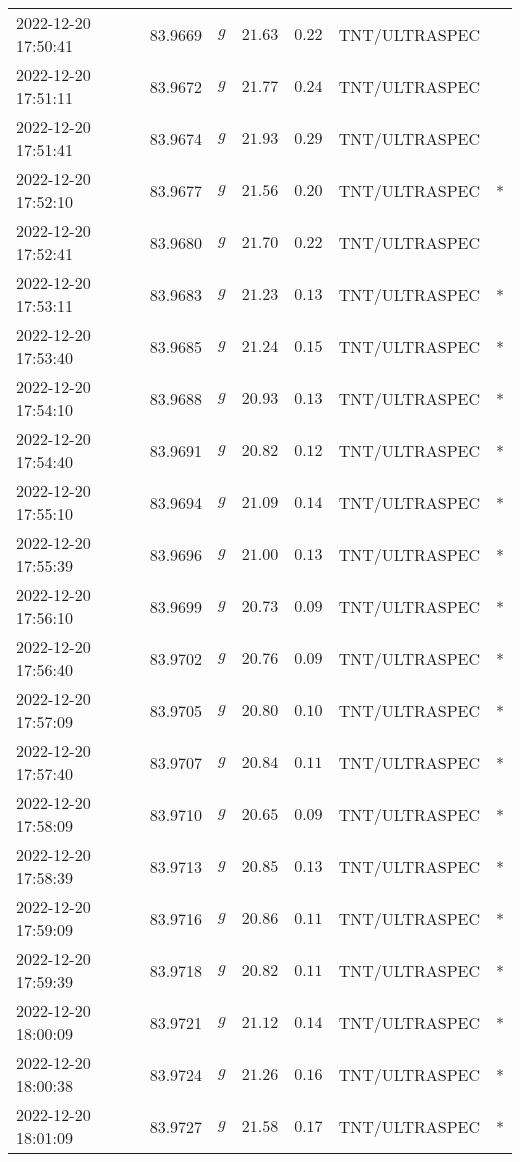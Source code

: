 \documentclass{nature_plusfigure}
\begin{document}
\begin{supplement}
\begin{center}
\begin{longtable}{lllllll}
2022-12-20 17:50:41 & 83.9669 & $g$ & $21.63$ & $0.22$ & TNT/ULTRASPEC &  \\ 
2022-12-20 17:51:11 & 83.9672 & $g$ & $21.77$ & $0.24$ & TNT/ULTRASPEC &  \\ 
2022-12-20 17:51:41 & 83.9674 & $g$ & $21.93$ & $0.29$ & TNT/ULTRASPEC &  \\ 
2022-12-20 17:52:10 & 83.9677 & $g$ & $21.56$ & $0.20$ & TNT/ULTRASPEC & * \\ 
2022-12-20 17:52:41 & 83.9680 & $g$ & $21.70$ & $0.22$ & TNT/ULTRASPEC &  \\ 
2022-12-20 17:53:11 & 83.9683 & $g$ & $21.23$ & $0.13$ & TNT/ULTRASPEC & * \\ 
2022-12-20 17:53:40 & 83.9685 & $g$ & $21.24$ & $0.15$ & TNT/ULTRASPEC & * \\ 
2022-12-20 17:54:10 & 83.9688 & $g$ & $20.93$ & $0.13$ & TNT/ULTRASPEC & * \\ 
2022-12-20 17:54:40 & 83.9691 & $g$ & $20.82$ & $0.12$ & TNT/ULTRASPEC & * \\ 
2022-12-20 17:55:10 & 83.9694 & $g$ & $21.09$ & $0.14$ & TNT/ULTRASPEC & * \\ 
2022-12-20 17:55:39 & 83.9696 & $g$ & $21.00$ & $0.13$ & TNT/ULTRASPEC & * \\ 
2022-12-20 17:56:10 & 83.9699 & $g$ & $20.73$ & $0.09$ & TNT/ULTRASPEC & * \\ 
2022-12-20 17:56:40 & 83.9702 & $g$ & $20.76$ & $0.09$ & TNT/ULTRASPEC & * \\ 
2022-12-20 17:57:09 & 83.9705 & $g$ & $20.80$ & $0.10$ & TNT/ULTRASPEC & * \\ 
2022-12-20 17:57:40 & 83.9707 & $g$ & $20.84$ & $0.11$ & TNT/ULTRASPEC & * \\ 
2022-12-20 17:58:09 & 83.9710 & $g$ & $20.65$ & $0.09$ & TNT/ULTRASPEC & * \\ 
2022-12-20 17:58:39 & 83.9713 & $g$ & $20.85$ & $0.13$ & TNT/ULTRASPEC & * \\ 
2022-12-20 17:59:09 & 83.9716 & $g$ & $20.86$ & $0.11$ & TNT/ULTRASPEC & * \\ 
2022-12-20 17:59:39 & 83.9718 & $g$ & $20.82$ & $0.11$ & TNT/ULTRASPEC & * \\ 
2022-12-20 18:00:09 & 83.9721 & $g$ & $21.12$ & $0.14$ & TNT/ULTRASPEC & * \\ 
2022-12-20 18:00:38 & 83.9724 & $g$ & $21.26$ & $0.16$ & TNT/ULTRASPEC & * \\ 
2022-12-20 18:01:09 & 83.9727 & $g$ & $21.58$ & $0.17$ & TNT/ULTRASPEC & * \\ 

\end{longtable}
\end{center}
\end{supplement}
\end{document}
